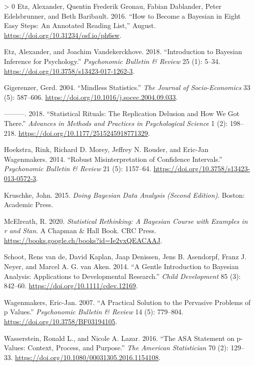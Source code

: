 \documentclass[]{tufte-handout}
\newlength{\cslhangindent}
\newenvironment{CSLReferences}[3] %
 {%
  \setlength{\parindent}{0pt}
  \ifodd #1 \everypar{\setlength{\hangindent}{\cslhangindent}}\ignorespaces\fi
  \ifnum #2 > 0
  \setlength{\parskip}{#2\baselineskip}
  \fi
 }%
 {}
\begin{document}
\hypertarget{refs}{}
\begin{CSLReferences}{1}{0}
\leavevmode\hypertarget{ref-etzHowBecomeBayesian2016}{}%
Etz, Alexander, Quentin Frederik Gronau, Fabian Dablander, Peter
Edelsbrunner, and Beth Baribault. 2016. {``How to Become a {Bayesian} in
Eight Easy Steps: {An} Annotated Reading List,''} August.
\url{https://doi.org/10.31234/osf.io/ph6sw}.

\leavevmode\hypertarget{ref-etzIntroductionBayesianInference2018}{}%
Etz, Alexander, and Joachim Vandekerckhove. 2018. {``Introduction to
{Bayesian Inference} for {Psychology}.''} \emph{Psychonomic Bulletin \&
Review} 25 (1): 5--34. \url{https://doi.org/10.3758/s13423-017-1262-3}.

\leavevmode\hypertarget{ref-gigerenzerMindlessStatistics2004}{}%
Gigerenzer, Gerd. 2004. {``Mindless Statistics.''} \emph{The Journal of
Socio-Economics} 33 (5): 587--606.
\url{https://doi.org/10.1016/j.socec.2004.09.033}.

\leavevmode\hypertarget{ref-gigerenzerStatisticalRitualsReplication2018a}{}%
---------. 2018. {``Statistical {Rituals}: {The Replication Delusion}
and {How We Got There}.''} \emph{Advances in Methods and Practices in
Psychological Science} 1 (2): 198--218.
\url{https://doi.org/10.1177/2515245918771329}.

\leavevmode\hypertarget{ref-hoekstraRobustMisinterpretationConfidence2014}{}%
Hoekstra, Rink, Richard D. Morey, Jeffrey N. Rouder, and Eric-Jan
Wagenmakers. 2014. {``Robust Misinterpretation of Confidence
Intervals.''} \emph{Psychonomic Bulletin \& Review} 21 (5): 1157--64.
\url{https://doi.org/10.3758/s13423-013-0572-3}.

\leavevmode\hypertarget{ref-kruschkeDoingBayesianData2015}{}%
Kruschke, John. 2015. \emph{Doing Bayesian Data Analysis (Second
Edition)}. {Boston}: {Academic Press}.

\leavevmode\hypertarget{ref-mcelreathStatisticalRethinkingBayesian2020}{}%
McElreath, R. 2020. \emph{Statistical Rethinking: {A} Bayesian Course
with Examples in r and Stan}. A Chapman \& Hall Book. {CRC Press}.
\url{https://books.google.ch/books?id=Ie2vxQEACAAJ}.

\leavevmode\hypertarget{ref-schootGentleIntroductionBayesian2014}{}%
Schoot, Rens van de, David Kaplan, Jaap Denissen, Jens B. Asendorpf,
Franz J. Neyer, and Marcel A. G. van Aken. 2014. {``A {Gentle
Introduction} to {Bayesian Analysis}: {Applications} to {Developmental
Research}.''} \emph{Child Development} 85 (3): 842--60.
\url{https://doi.org/10.1111/cdev.12169}.

\leavevmode\hypertarget{ref-wagenmakersPracticalSolutionPervasive2007}{}%
Wagenmakers, Eric-Jan. 2007. {``A Practical Solution to the Pervasive
Problems of p Values.''} \emph{Psychonomic Bulletin \& Review} 14 (5):
779--804. \url{https://doi.org/10.3758/BF03194105}.

\leavevmode\hypertarget{ref-wassersteinASAStatementPValues2016}{}%
Wasserstein, Ronald L., and Nicole A. Lazar. 2016. {``The {ASA
Statement} on p-{Values}: {Context}, {Process}, and {Purpose}.''}
\emph{The American Statistician} 70 (2): 129--33.
\url{https://doi.org/10.1080/00031305.2016.1154108}.

\end{CSLReferences}
\end{document}
